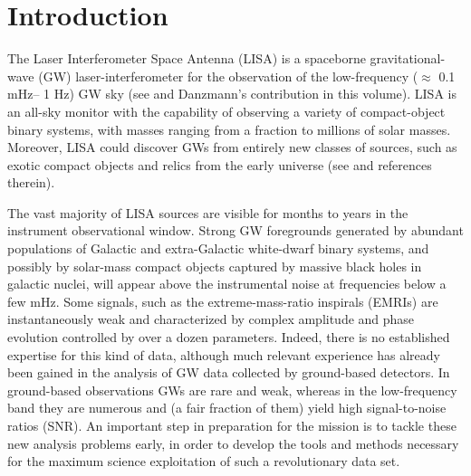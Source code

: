 \documentclass[12pt]{iopart}
\begin{document}

\section{Introduction}
\label{s:intro}

The Laser Interferometer Space Antenna (LISA) is a spaceborne gravitational-wave (GW) laser-interferometer for the observation of the low-frequency  ($\approx$ 0.1 mHz-- 1 Hz) GW sky (see \cite{ScienceCase,lisappa} and Danzmann's contribution in this volume). LISA is an all-sky monitor with the capability of observing a variety of compact-object binary systems, with masses ranging from a fraction to millions of solar masses. Moreover, LISA could discover GWs from entirely new classes of sources, such as exotic compact objects and relics from the early universe (see \cite{ScienceCase,CT2002} and references therein).

The vast majority of LISA sources are visible for months to years in the instrument observational window. Strong GW foregrounds generated by abundant populations of Galactic and extra-Galactic white-dwarf binary systems, and possibly by solar-mass compact objects captured by massive black holes in galactic nuclei, will appear above the instrumental noise at frequencies below a few mHz. Some signals, such as the extreme-mass-ratio inspirals (EMRIs) are instantaneously weak and characterized by complex amplitude and phase evolution controlled by over a dozen parameters. Indeed, there is no established expertise for this kind of data, although much relevant experience has already been gained in the analysis of GW data collected by ground-based detectors. In ground-based observations GWs are rare and weak, whereas in the low-frequency band they are numerous and (a fair fraction of them) yield high signal-to-noise ratios (SNR). An important step in preparation for the mission is to tackle these new analysis problems early, in order to develop the tools and methods necessary for the maximum science exploitation of such a revolutionary data set.
\end{document}
